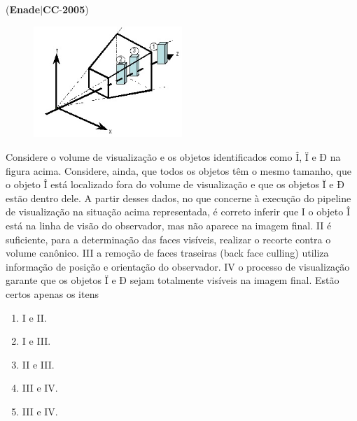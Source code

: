 \documentclass{exam}
\begin{document}
\begin{questions}
\question (\textbf{Enade}$|$\textbf{CC}-\textbf{2005}) \begin{figure}[H]
	\begin{center}
		\includegraphics[width=0.5\textwidth]{CIENCIA_DA_COMPUTACAO_Prova2005-utf8_figuras/fig-0030.jpg}
	\end{center}
\end{figure}
Considere o volume de visualização e os objetos identificados
como Î, Ï e Ð na figura acima. Considere, ainda, que todos os
objetos têm o mesmo tamanho, que o objeto Î está localizado fora
do volume de visualização e que os objetos Ï e Ð estão dentro
dele. A partir desses dados, no que concerne à execução do
pipeline de visualização na situação acima representada, é correto
inferir que
I o objeto Î está na linha de visão do observador, mas não
aparece na imagem final.
II é suficiente, para a determinação das faces visíveis, realizar o
recorte contra o volume canônico.
III a remoção de faces traseiras (back face culling) utiliza
informação de posição e orientação do observador.
IV o processo de visualização garante que os objetos Ï e Ð sejam
totalmente visíveis na imagem final.
Estão certos apenas os itens
	\begin{enumerate}[label=\alph*)]
		\item  I e II.
		\item  I e III.
		\item  II e III.
		\item  III e IV.
		\item  III e IV.

	\end{enumerate}


\end{questions}
\end{document}
